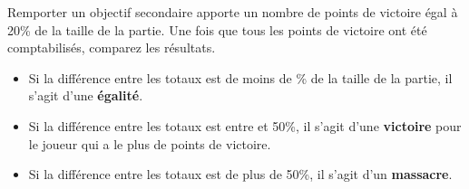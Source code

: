 Remporter un objectif secondaire apporte un nombre de points de victoire égal à 20\% de la taille de la partie. Une fois que tous les points de victoire ont été comptabilisés, comparez les résultats.
\begin{itemize}
\item Si la différence entre les totaux est de moins de \% de la taille de la partie, il s'agit d'une \textbf{égalité}.
\item Si la différence entre les totaux est entre  et 50\%, il s'agit d'une \textbf{victoire} pour le joueur qui a le plus de points de victoire.
\item Si la différence entre les totaux est de plus de 50\%, il s'agit d'un \textbf{massacre}.
\end{itemize}

